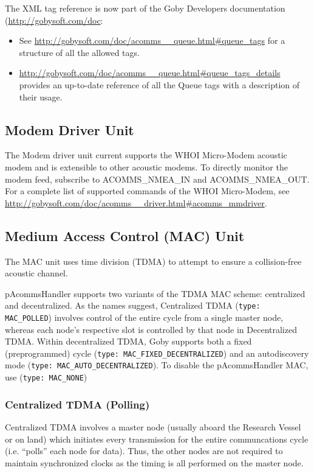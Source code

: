 \documentclass[11pt, letterpaper, oneside]{memoir}
\begin{document}
The XML tag reference is now part of the Goby Developers documentation (\url{http://gobysoft.com/doc}:
\begin{itemize}
\item See \url{http://gobysoft.com/doc/acomms__queue.html#queue_tags} for a structure of all the allowed tags.
\item \url{http://gobysoft.com/doc/acomms__queue.html#queue_tags_details} provides an up-to-date reference of all the Queue tags with a description of their usage.
\end{itemize}  

\subsection{Modem Driver Unit}

The Modem driver unit current supports the WHOI Micro-Modem acoustic modem and is extensible to other acoustic modems. To directly monitor the modem feed, subscribe to ACOMMS\_NMEA\_IN and ACOMMS\_NMEA\_OUT. For a complete list of supported commands of the WHOI Micro-Modem, see \url{http://gobysoft.com/doc/acomms__driver.html#acomms_mmdriver}.

\subsection{Medium Access Control (MAC) Unit}

The MAC unit uses time division (TDMA) to attempt to ensure a collision-free acoustic channel.

pAcommsHandler supports two variants of the TDMA MAC scheme: centralized and decentralized. As the names suggest, Centralized TDMA (\verb|type: MAC_POLLED|) involves control of the entire cycle from a single master node, whereas each node's respective slot is controlled by that node in Decentralized TDMA. Within decentralized TDMA, Goby supports both a fixed (preprogrammed) cycle (\verb|type: MAC_FIXED_DECENTRALIZED|) and an autodiscovery mode (\verb|type: MAC_AUTO_DECENTRALIZED|). To disable the pAcommsHandler MAC, use (\verb|type: MAC_NONE|)

\subsubsection{Centralized TDMA (Polling)}

Centralized TDMA involves a master node (usually aboard the Research Vessel or on land) which initiates every transmission for the entire communcations cycle (i.e. ``polls'' each node for data). Thus, the other nodes are not required to maintain synchronized clocks as the timing is all performed on the master node.
\end{document}
